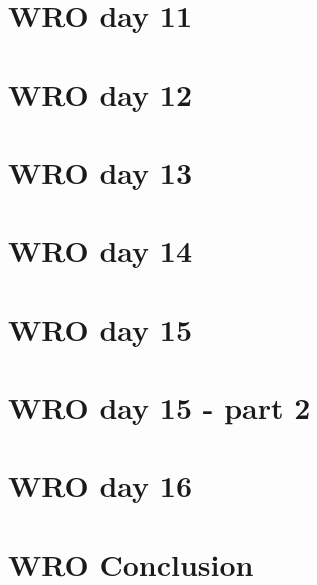 \documentclass[a4paper,11pt,article,oneside]{memoir}
\begin{document}
\section{WRO day 11}

\clearpage
\section{WRO day 12}

\clearpage
\section{WRO day 13}

\clearpage
\section{WRO day 14}

\clearpage
\section{WRO day 15}

\clearpage
\section{WRO day 15 - part 2}

\clearpage
\section{WRO day 16}

\clearpage
\section{WRO Conclusion}

\end{document}
